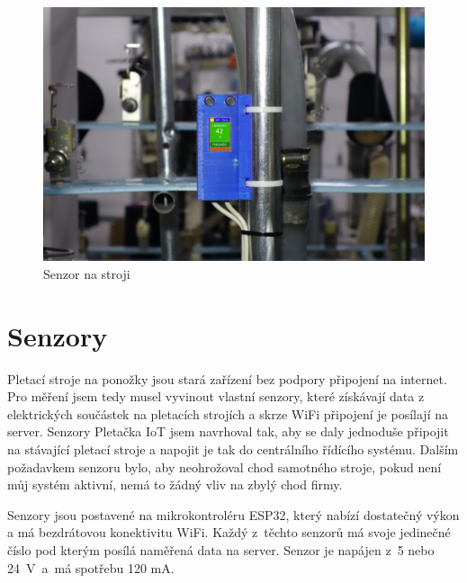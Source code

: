 \documentclass{template/socthesis}
\begin{document}
\begin{figure}[htbp]
    \centering
    \includegraphics[width=\textwidth]{img/V2-uchyceni.png}
    \caption{Senzor na stroji}
    \label{fig:SenzorNaStroji}
\end{figure}


\section{Senzory}

Pletací stroje na ponožky jsou stará zařízení bez podpory připojení na internet. 
Pro měření jsem tedy musel vyvinout vlastní  senzory, které získávají data z elektrických součástek na pletacích  strojích a skrze WiFi připojení je posílají  na server.
Senzory Pletačka IoT jsem navrhoval tak, aby se daly jednoduše připojit na stávající pletací stroje a napojit je tak do centrálního řídícího systému.
Dalším požadavkem senzoru bylo, aby neohrožoval chod samotného stroje, pokud není můj systém aktivní, nemá to žádný vliv na zbylý chod firmy.

Senzory jsou postavené na mikrokontroléru ESP32, který nabízí dostatečný výkon a má bezdrátovou konektivitu WiFi.
Každý z~těchto senzorů má svoje jedinečné číslo pod kterým posílá naměřená data na server.
Senzor je napájen z~5 nebo 24~V~a~má spotřebu 120 mA.
\end{document}
